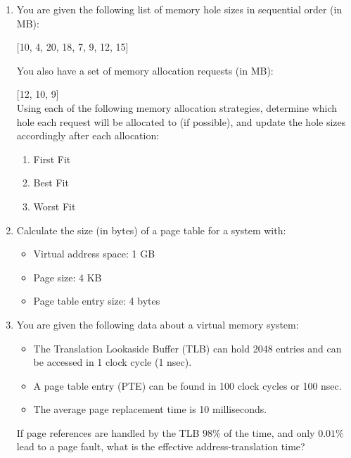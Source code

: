 \documentclass[12pt]{article}
\begin{document}
\begin{enumerate}[label=\textbf{Q\arabic*.}]
    \item You are given the following list of memory hole sizes in sequential order (in MB):

    [10, 4, 20, 18, 7, 9, 12, 15]
    
    You also have a set of memory allocation requests (in MB): 
    
    [12, 10, 9]\\
    
    Using each of the following memory allocation strategies, determine which hole each request will be allocated to (if possible), and update the hole sizes accordingly after each allocation:

    \begin{enumerate}[label=(\alph*)]
        \item First Fit\\
        \item Best Fit\\
        \item Worst Fit\\
    \end{enumerate}

    \item Calculate the size (in bytes) of a page table for a system with:
    
    \begin{itemize}
        \item Virtual address space: 1 GB
        \item Page size: 4 KB
        \item Page table entry size: 4 bytes\\
    \end{itemize}

    \item You are given the following data about a virtual memory system:
    \begin{itemize}
        \item The Translation Lookaside Buffer (TLB) can hold 2048 entries and can be accessed in 1 clock cycle (1 nsec).
        \item A page table entry (PTE) can be found in 100 clock cycles or 100 nsec.
        \item The average page replacement time is 10 milliseconds.
    \end{itemize}
    
    If page references are handled by the TLB $98\%$ of the time, and only $0.01\%$ lead to a page fault, what is the effective address-translation time?\\


\end{enumerate}
\end{document}
